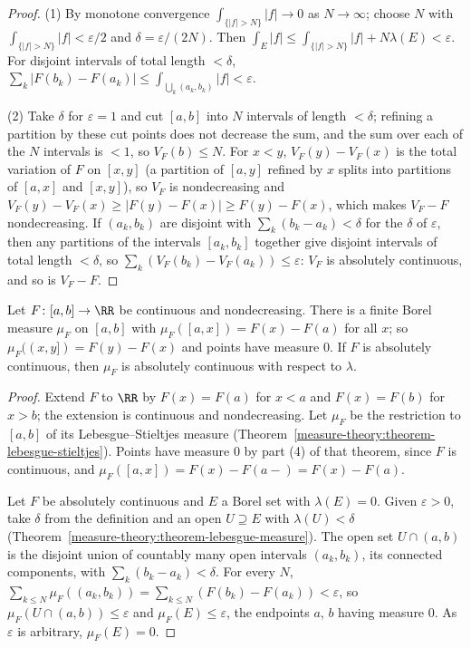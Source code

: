 \begin{proof}
(1) By monotone convergence $\int_{\{|f| > N\}}|f| \to 0$ as $N \to \infty$; choose $N$ with $\int_{\{|f| > N\}}|f| < \varepsilon/2$ and $\delta = \varepsilon/(2N)$. Then
$\int_E|f| \leq \int_{\{|f| > N\}}|f| + N\lambda(E) < \varepsilon$. For disjoint intervals of total length $< \delta$, $\sum_k|F(b_k) - F(a_k)| \leq \int_{\bigcup_k(a_k, b_k)}|f| < \varepsilon$.

(2) Take $\delta$ for $\varepsilon = 1$ and cut $[a, b]$ into $N$ intervals of length $< \delta$; refining a partition by these cut points does not decrease the sum, and the sum
over each of the $N$ intervals is $< 1$, so $V_F(b) \leq N$. For $x < y$, $V_F(y) - V_F(x)$ is the total variation of $F$ on $[x, y]$ (a partition of $[a, y]$ refined by $x$ splits
into partitions of $[a, x]$ and $[x, y]$), so $V_F$ is nondecreasing and $V_F(y) - V_F(x) \geq |F(y) - F(x)| \geq F(y) - F(x)$, which makes $V_F - F$ nondecreasing. If
$(a_k, b_k)$ are disjoint with $\sum_k(b_k - a_k) < \delta$ for the $\delta$ of $\varepsilon$, then any partitions of the intervals $[a_k, b_k]$ together give disjoint intervals of total
length $< \delta$, so $\sum_k(V_F(b_k) - V_F(a_k)) \leq \varepsilon$: $V_F$ is absolutely continuous, and so is $V_F - F$.
\end{proof}

\begin{lemma}\label{lebesgue-differentiation:lemma-stieltjes}
Let $F \colon [a, b] \to \RR$ be continuous and nondecreasing. There is a finite Borel measure $\mu_F$ on $[a, b]$ with $\mu_F([a, x]) = F(x) - F(a)$ for all $x$; so
$\mu_F((x, y]) = F(y) - F(x)$ and points have measure $0$. If $F$ is absolutely continuous, then $\mu_F$ is absolutely continuous with respect to $\lambda$.
\end{lemma}

\begin{proof}
Extend $F$ to $\RR$ by $F(x) = F(a)$ for $x < a$ and $F(x) = F(b)$ for $x > b$; the extension is continuous and nondecreasing. Let $\mu_F$ be the restriction to $[a, b]$ of its
Lebesgue--Stieltjes measure (Theorem~\ref{measure-theory:theorem-lebesgue-stieltjes}). Points have measure $0$ by part (4) of that theorem, since $F$ is continuous, and
$\mu_F([a, x]) = F(x) - F(a-) = F(x) - F(a)$.

Let $F$ be absolutely continuous and $E$ a Borel set with $\lambda(E) = 0$. Given $\varepsilon > 0$, take $\delta$ from the definition and an open $U \supseteq E$ with $\lambda(U) < \delta$
(Theorem~\ref{measure-theory:theorem-lebesgue-measure}). The open set $U \cap (a, b)$ is the disjoint union of countably many open intervals $(a_k, b_k)$, its connected components,
with $\sum_k(b_k - a_k) < \delta$. For every $N$, $\sum_{k \leq N}\mu_F((a_k, b_k)) = \sum_{k \leq N}(F(b_k) - F(a_k)) < \varepsilon$, so $\mu_F(U \cap (a, b)) \leq \varepsilon$ and
$\mu_F(E) \leq \varepsilon$, the endpoints $a$, $b$ having measure $0$. As $\varepsilon$ is arbitrary, $\mu_F(E) = 0$.
\end{proof}

